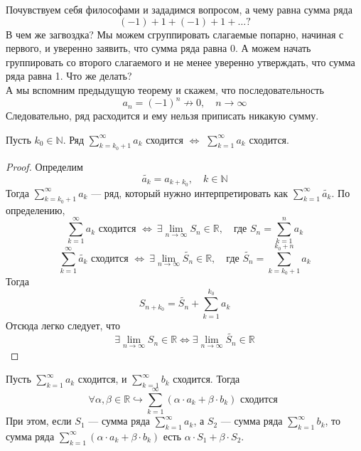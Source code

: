 \documentclass[11pt]{article}
\begin{document}
\begin{example}
    Почувствуем себя философами и зададимся вопросом, а чему равна сумма ряда \[(-1) + 1 + (-1) + 1 + \dots ?\]
    В чем же загвоздка? Мы можем сгруппировать слагаемые попарно, начиная с первого,
    и уверенно заявить, что сумма ряда равна 0. А можем начать группировать со второго
    слагаемого и не менее уверенно утверждать, что сумма ряда равна 1. Что же делать? \\
    А мы вспомним предыдущую теорему и скажем, что последовательность \[a_n = (-1)^n 
    \nrightarrow 0, \quad n \to \infty\] Следовательно, ряд расходится и ему нельзя
    приписать никакую сумму.
\end{example}

\begin{theorem}
    Пусть $k_0 \in \mathbb{N}$. Ряд $\displaystyle \sum_{k = k_0 + 1}^{\infty} a_k$
    сходится $\Longleftrightarrow$ $\displaystyle \sum_{k = 1}^{\infty} a_k$
    сходится.
\end{theorem}

\begin{proof}
    Определим \[\widetilde{a_k} = a_{k + k_0}, \quad k \in \mathbb{N}\] Тогда 
    $\displaystyle \sum_{k = k_0 + 1}^{\infty} a_k$ --- ряд, который нужно
    интерпретировать как $\displaystyle \sum_{k = 1}^{\infty} \widetilde{a_k}$.
    По определению, \[\sum_{k = 1}^{\infty} a_k \text{ сходится } \Longleftrightarrow
    \ \exists \lim_{n \to \infty} S_n \in \mathbb{R}, \quad \text{где } S_n = 
    \sum_{k = 1}^{n} a_k\]
    \[\sum_{k = 1}^{\infty} \widetilde{a_k} \text{ сходится } \Longleftrightarrow
    \ \exists \lim_{n \to \infty} \widetilde{S_n} \in \mathbb{R}, \quad \text{где } 
    \widetilde{S_n} = \sum_{k = k_0 + 1}^{k_0 + n} a_k\]
    Тогда \[S_{n + k_0} = \widetilde{S_n} + \sum_{k = 1}^{k_0} a_k\]
    Отсюда легко следует, что \[\exists \lim_{n \to \infty} S_n \in \mathbb{R} 
    \Longleftrightarrow \exists \lim_{n \to \infty} \widetilde{S_n} \in \mathbb{R}\]
\end{proof}

\begin{theorem}[Линейность]
    Пусть $\displaystyle \sum_{k = 1}^{\infty} a_k$ сходится, и
    $\displaystyle \sum_{k = 1}^{\infty} b_k$ сходится. Тогда \[\forall \alpha, \beta
    \in \mathbb{R} \hookrightarrow \sum_{k = 1}^{\infty} (\alpha \cdot a_k + \beta
    \cdot b_k) \text{ сходится }\] 
    При этом, если $S_1$ --- сумма ряда $\displaystyle \sum_{k = 1}^{\infty} a_k$,
    а $S_2$ --- сумма ряда $\displaystyle \sum_{k = 1}^{\infty} b_k$, то сумма ряда 
    $\displaystyle \sum_{k = 1}^{\infty} (\alpha \cdot a_k + \beta \cdot b_k)$ есть 
    $\alpha \cdot S_1 + \beta \cdot S_2$.
\end{theorem}
\end{document}
